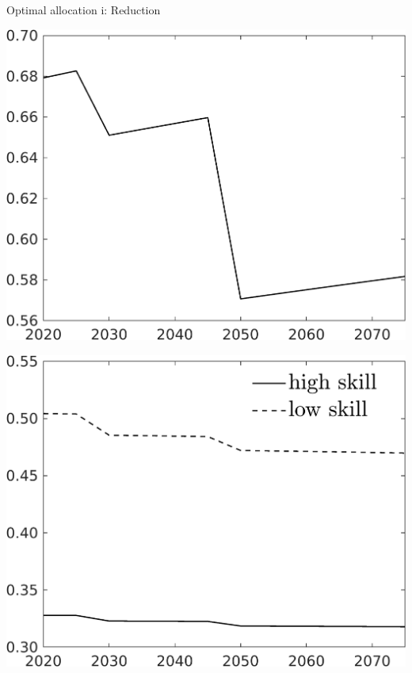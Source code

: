 \documentclass[11pt,aspectratio=169]{beamer}
\begin{document}
\begin{frame}{Optimal allocation i: Reduction}
	\centering
\begin{minipage}[]{0.32\textwidth}
	\includegraphics[width=1\textwidth]{../codding_model/own_basedOnFried/optimalPol_elastS_DisuSci/figures/all_1705/Single_OPT_T_NoTaus_C_spillover0_sep1_BN0_ineq0_red0_etaa0.79.png}
\end{minipage}
	\begin{minipage}[]{0.32\textwidth}
		\includegraphics[width=1\textwidth]{../codding_model/own_basedOnFried/optimalPol_elastS_DisuSci/figures/all_1705/SingleJoint_OPT_T_NoTaus_labour_spillover0_sep1_BN0_ineq0_red0_etaa0.79_lgd1.png}

\end{minipage}
\end{frame}
\end{document}
